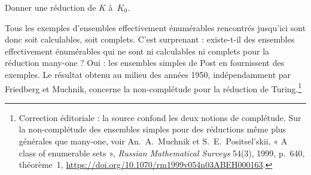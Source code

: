 \documentclass[../../../include/open-logic-section]{subfiles}
\begin{document}
\begin{prob}
Donner une réduction de $K$ à~$K_0$.
\end{prob}

\begin{digress}
Tous les exemples d'ensembles effectivement
énumérables rencontrés jusqu'ici sont donc soit
calculables, soit complets. C'est surprenant :
existe-t-il des ensembles effectivement
énumérables qui ne sont ni calculables ni
complets pour la réduction many-one ? Oui : les ensembles simples de Post en fournissent des exemples.
Le résultat obtenu au milieu des années 1950, indépendamment
par Friedberg et Muchnik, concerne la non-complétude pour la réduction de Turing.\footnote{Correction éditoriale : la source confond les deux notions de complétude. Sur la non-complétude des ensembles simples pour des réductions même plus générales que many-one, voir An.~A.~Muchnik et S.~E.~Positsel'skii, « A class of enumerable sets », \emph{Russian Mathematical Surveys} 54(3), 1999, p.~640, théorème~1, \url{https://doi.org/10.1070/rm1999v054n03ABEH000163}.}
\end{digress}
\end{document}
